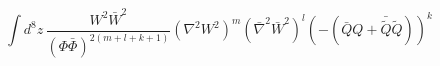 \begin{equation}\label{genterm}
\int d^{8}z\,
\frac{W^2 \bar{W}^2}
{(\Phi\bar{\Phi})^{2(m+l+k+1)}}
(\nabla^2 W^2)^{m}
({\bar{\nabla}}^{2}\bar{W}^2)^l
\left(-(\bar{Q}Q+\bar{\tilde{Q}}\tilde{Q})\right)^{k}
\end{equation}

